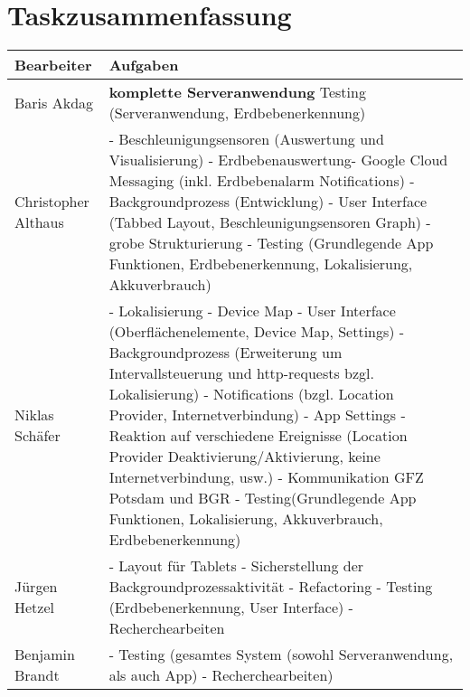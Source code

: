 \documentclass[10pt,a4paper]{article}
\begin{document}
\section{Taskzusammenfassung}
\begin{tabular}{ | l | p{11cm} |}
	\hline
	\textbf{Bearbeiter} & \textbf{Aufgaben}\\    
	\hline
	Baris Akdag & 	\textbf{komplette Serveranwendung}
					\newline Testing (Serveranwendung, Erdbebenerkennung)		\\
	\hline	
	Christopher Althaus & 	- 	Beschleunigungsensoren (Auswertung und Visualisierung)\newline 
							- 	Erdbebenauswertung\newline - Google Cloud Messaging (inkl. Erdbebenalarm Notifications)\newline 
							- 	Backgroundprozess (Entwicklung)\newline 
							- 	User Interface (Tabbed Layout, Beschleunigungsensoren Graph)\newline 
							- 	grobe Strukturierung\newline 
							- 	Testing (Grundlegende App Funktionen, Erdbebenerkennung, Lokalisierung, Akkuverbrauch)	\\    
    \hline
	Niklas Schäfer & 		- 	Lokalisierung\newline 
							- 	Device Map\newline 
							- 	User Interface (Oberflächenelemente, Device Map, Settings)\newline 
							- 	Backgroundprozess (Erweiterung um Intervallsteuerung und http-requests bzgl. Lokalisierung)\newline 
							- 	Notifications (bzgl. Location Provider, Internetverbindung)\newline 
							- 	App Settings\newline 
							- 	Reaktion auf verschiedene Ereignisse (Location Provider Deaktivierung/Aktivierung, keine Internetverbindung, usw.)\newline 
							- 	Kommunikation GFZ Potsdam und BGR\newline 
							- 	Testing(Grundlegende App Funktionen, Lokalisierung, Akkuverbrauch, Erdbebenerkennung) \\
	\hline	
	Jürgen Hetzel & 			- 	Layout für Tablets\newline 
							- 	Sicherstellung der Backgroundprozessaktivität\newline 
							- 	Refactoring\newline 
							- 	Testing (Erdbebenerkennung, User Interface)\newline 
							- 	Recherchearbeiten \\
	\hline	
	Benjamin Brandt & 		- Testing (gesamtes System (sowohl Serveranwendung, als auch App)\newline 
							- Recherchearbeiten)	\\
	\hline	
\end{tabular}
\end{document}
